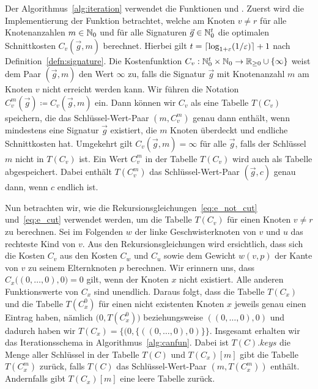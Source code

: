 Der Algorithmus~\ref{alg:iteration} verwendet die Funktionen \canfun{} und \carfun{}.
Zuerst wird die Implementierung der Funktion \canfun{} betrachtet, welche am Knoten $v \neq r$ für alle Knotenanzahlen $m \in \mathbb{N}_0$ und für alle Signaturen $\vec{g} \in \mathbb{N}_0^t$ die optimalen Schnittkosten $C_v(\vec{g}, m)$ berechnet.
Hierbei gilt $t = \lceil\log_{1+\varepsilon}(1/\varepsilon)\rceil + 1$ nach Definition~\ref{defn:signature}.
Die Kostenfunktion $C_v : \mathbb{N}_0^t \times \mathbb{N}_0 \rightarrow \mathbb{R}_{\geq 0} \cup \{\infty\}$ weist dem Paar $(\vec{g}, m)$ den Wert $\infty$ zu, falls die Signatur $\vec{g}$ mit Knotenanzahl $m$ am Knoten $v$ nicht erreicht werden kann.
Wir führen die Notation $C^m_v(\vec{g}) \coloneqq C_v(\vec{g}, m)$ ein.
Dann können wir $C_v$ als eine Tabelle $T(C_v)$ speichern, die das Schlüssel-Wert-Paar $(m,C^m_v)$ genau dann enthält, wenn mindestens eine Signatur $\vec{g}$ existiert, die $m$ Knoten überdeckt und endliche Schnittkosten hat.
Umgekehrt gilt $C_v(\vec{g}, m) = \infty$ für alle $\vec{g}$, falls der Schlüssel $m$ nicht in $T(C_v)$ ist.
Ein Wert $C_v^m$ in der Tabelle $T(C_v)$ wird auch als Tabelle abgespeichert.
Dabei enthält $T(C_v^m)$ das Schlüssel-Wert-Paar $(\vec{g}, c)$ genau dann, wenn $c$ endlich ist.

Nun betrachten wir, wie die Rekursionsgleichungen~\eqref{eq:e_not_cut} und~\eqref{eq:e_cut} verwendet werden, um die Tabelle $T(C_v)$ für einen Knoten $v \neq r$ zu berechnen.
Sei im Folgenden $w$ der linke Geschwisterknoten von $v$ und $u$ das rechteste Kind von $v$.
Aus den Rekursionsgleichungen wird ersichtlich, dass sich die Kosten $C_v$ aus den Kosten $C_w$ und $C_u$ sowie dem Gewicht $w(v, p)$ der Kante von $v$ zu seinem Elternknoten $p$ berechnen.
Wir erinnern uns, dass $C_x\big((0,\ldots, 0),0\big) = 0$ gilt, wenn der Knoten $x$ nicht existiert. 
Alle anderen Funktionswerte von $C_x$ sind unendlich.
Daraus folgt, dass die Tabelle $T(C_x)$ und die Tabelle $T(C^0_x)$ für einen nicht existenten Knoten $x$ jeweils genau einen Eintrag haben, nämlich $\big(0, T(C^0_x)\big)$ beziehungsweise $((0,\ldots,0), 0)$ und dadurch haben wir $T(C_x) = \big\{(0, \{((0, \ldots, 0), 0)\}\big\}$.
Insgesamt erhalten wir das Iterationsschema in Algorithmus~\ref{alg:canfun}.
Dabei ist $T(C).keys$ die Menge aller Schlüssel in der Tabelle $T(C)$ und $T(C_x)[m]$ gibt die Tabelle $T(C^m_x)$ zurück, falls $T(C)$ das Schlüssel-Wert-Paar $(m, T(C^m_x))$ enthält.
Andernfalls gibt $T(C_x)[m]$ eine leere Tabelle zurück.

